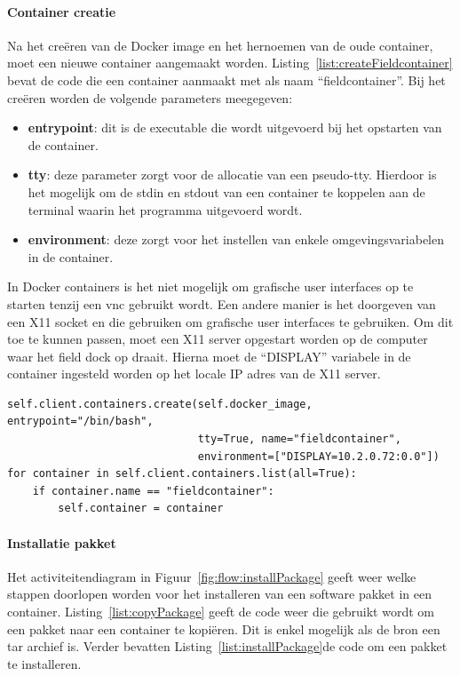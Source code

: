 \paragraph{Container creatie}
Na het creëren van de Docker image en het hernoemen van de oude container, moet een nieuwe container aangemaakt worden.
Listing~\ref{list:createFieldcontainer} bevat de code die een container aanmaakt met als naam ``fieldcontainer''.
Bij het creëren worden de volgende parameters meegegeven:
\begin{itemize}
\item \textbf{entrypoint}: dit is de executable die wordt uitgevoerd bij het opstarten van de container.
\item \textbf{tty}: deze parameter zorgt voor de allocatie van een pseudo-tty. 
Hierdoor is het mogelijk om de stdin en stdout van een container te koppelen aan de terminal waarin het programma uitgevoerd wordt.
\item \textbf{environment}: deze zorgt voor het instellen van enkele omgevingsvariabelen in de container.
\end{itemize}
In Docker containers is het niet mogelijk om grafische user interfaces op te starten tenzij een vnc gebruikt wordt.
Een andere manier is het doorgeven van een X11 socket en die gebruiken om grafische user interfaces te gebruiken.
Om dit toe te kunnen passen, moet een X11 server opgestart worden op de computer waar het field dock op draait.
Hierna moet de ``DISPLAY'' variabele in de container ingesteld worden op het locale IP adres van de X11 server.

\begin{minipage}{\linewidth}
\begin{center}
\begin{lstlisting}[caption={Creatie van fieldcontainer},label={list:createFieldcontainer}]
self.client.containers.create(self.docker_image, entrypoint="/bin/bash",
                              tty=True, name="fieldcontainer",
                              environment=["DISPLAY=10.2.0.72:0.0"])
for container in self.client.containers.list(all=True):
    if container.name == "fieldcontainer":
        self.container = container
\end{lstlisting}
\end{center}
\end{minipage}

\paragraph{Installatie pakket}
Het activiteitendiagram in Figuur~\ref{fig:flow:installPackage} geeft weer welke stappen doorlopen worden voor het installeren van een software pakket in een container.
Listing~\ref{list:copyPackage} geeft de code weer die gebruikt wordt om een pakket naar een container te kopiëren.
Dit is enkel mogelijk als de bron een tar archief is.
Verder bevatten Listing~\ref{list:installPackage}de code om een pakket te installeren.

